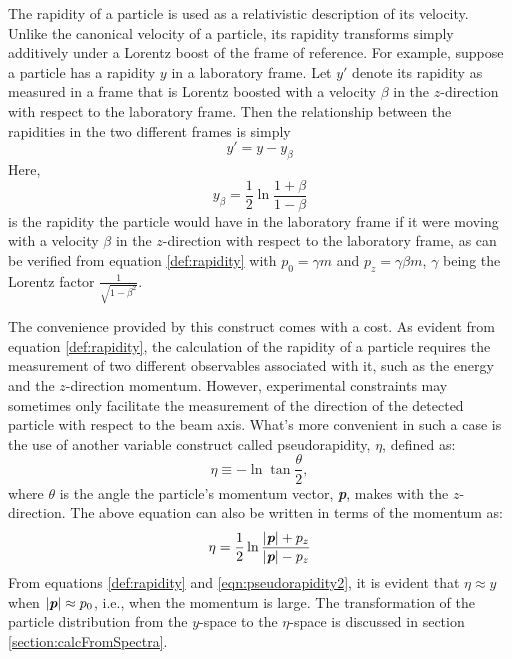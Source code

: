 The rapidity of a particle is used as a relativistic description of its velocity. Unlike the canonical velocity of a particle, its rapidity transforms simply additively under a Lorentz boost of the frame of reference. For example, suppose a particle has a rapidity $y$ in a laboratory frame. Let $y'$ denote its rapidity as measured in a frame that is Lorentz boosted with a velocity $\beta$ in the $z$-direction with respect to the laboratory frame. Then the relationship between the rapidities in the two different frames is simply
	\begin{equation}\label{eqn:rapidityTransformation}
	y' = y - y_{\beta}
	\end{equation}
Here,
	\begin{equation}
	y_{\beta} = \frac{1}{2}\ln{\frac{1 + \beta}{1 - \beta}}
	\end{equation}
is the rapidity the particle would have in the laboratory frame if it were moving with a velocity $\beta$ in the $z$-direction with respect to the laboratory frame, as can be verified from equation \ref{def:rapidity} with $p_{0} = \gamma m$ and $p_{z} = \gamma \beta m$, $\gamma$ being the Lorentz factor $\frac{1}{\sqrt{1 - \beta^2}}$.\cite{wong1994introduction}

The convenience provided by this construct comes with a cost. As evident from equation \ref{def:rapidity}, the calculation of the rapidity of a particle requires the measurement of two different observables associated with it, such as the energy and the $z$-direction momentum. However, experimental constraints may sometimes only facilitate the measurement of the direction of the detected particle with respect to the beam axis. What's more convenient in such a case is the use of another variable construct called pseudorapidity, $\eta$, defined as:
	\begin{equation}\label{def:pseudorapidity}
	\eta \equiv -\ln{\tan{\frac{\theta}{2}}},
	\end{equation}
where $\theta$ is the angle the particle's momentum vector, \textit{\textbf{p}}, makes with the $z$-direction. The above equation can also be written in terms of the momentum as:	
	\begin{equation}\label{eqn:pseudorapidity2}
	\eta = \frac{1}{2}\ln{\frac{\left|{\textit{\textbf{p}}}\right| + p_{z}}{\left|{\textit{\textbf{p}}}\right|- p_{z}}}
	\end{equation}
From equations \ref{def:rapidity} and \ref{eqn:pseudorapidity2}, it is evident that $\eta \approx y$ when $\left|{\textit{\textbf{p}}}\right| \approx p_{0}$, i.e., when the momentum is large. The transformation of the particle distribution from the $y$-space to the $\eta$-space is discussed in section \ref{section:calcFromSpectra}.
 

